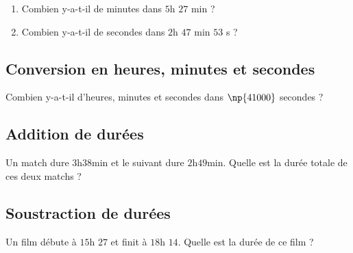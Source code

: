 \documentclass[a4paper,10pt]{report}
\begin{document}
\begin{ex}
\begin{enumerate}
\item Combien y-a-t-il de minutes dans $5$h $27$ min ?
\item Combien y-a-t-il de secondes dans $2$h $47$ min $53$ s ?
\end{enumerate}

\noindent\grandscarreaux{\linewidth}{3.2cm}
\end{ex} 

\subsection{Conversion en heures, minutes et secondes}

\begin{ex}
Combien y-a-t-il d'heures, minutes et secondes dans $\np{41000}$ secondes ?

\noindent\grandscarreaux{\linewidth}{3.2cm}
\end{ex} 

\subsection{Addition de durées}

\begin{ex}
Un match dure $3$h$38$min et le suivant dure $2$h$49$min. Quelle est la durée totale de ces deux matchs ?

\noindent\grandscarreaux{\linewidth}{4.8cm}
\end{ex} 

\subsection{Soustraction de durées}

\begin{ex}
Un film débute à $15$h $27$ et finit à $18$h $14$. Quelle est la durée de ce film ?

\noindent\grandscarreaux{\linewidth}{4.8cm}
\end{ex} 
\end{document}
